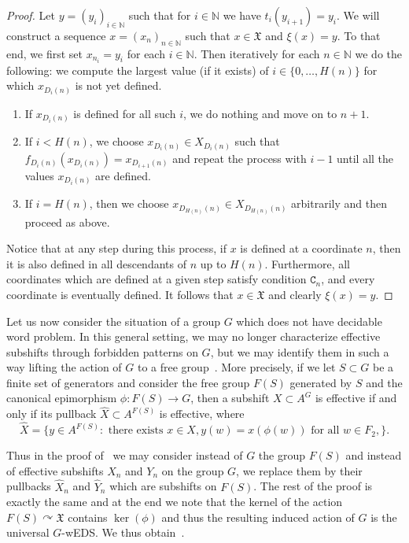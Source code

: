 \documentclass{article}
\theoremstyle{definition}
\theoremstyle{plain}
\newcommand{\NN}{\mathbb{N}}
\begin{document}
\begin{proof}
        Let $y = (y_i)_{i \in \NN}$ such that for $i \in \NN$ we have $t_i(y_{i+1})=y_{i}$. We will construct a sequence $x=(x_n)_{n \in \NN}$ such that $x \in \mathfrak{X}$ and $\xi(x)=y$. To that end, we first set $x_{n_i}=y_i$ for each $i \in \NN$. Then iteratively for each $n \in \NN$ we do the following: we compute the largest value (if it exists) of $i \in \{0,\dots,H(n)\}$ for which $x_{D_i(n)}$ is not yet defined.
        \begin{enumerate}
            \item If $x_{D_i(n)}$ is defined for all such $i$, we do nothing and move on to $n+1$.
            \item If $i < H(n)$, we choose $x_{D_i(n)} \in X_{D_i(n)}$ such that $f_{D_i(n)}(x_{D_i(n)}) = x_{D_{i+1}(n)}$ and repeat the process with $i-1$ until all the values $x_{D_i(n)}$ are defined.
            \item If $i = H(n)$, then we choose $x_{D_{H(n)}(n)} \in X_{D_{H(n)}(n)}$ arbitrarily and then proceed as above.
        \end{enumerate} 

        Notice that at any step during this process, if $x$ is defined at a coordinate $n$, then it is also defined in all descendants of $n$ up to $H(n)$. Furthermore, all coordinates which are defined at a given step satisfy condition $\mathtt{C}_n$, and every coordinate is eventually defined. It follows that $x\in \mathfrak{X}$ and clearly $\xi(x)=y$.\end{proof}

        Let us now consider the situation of a group $G$ which does not have decidable word problem.  In this general setting, we may no longer characterize effective subshifts through forbidden patterns on $G$, but we may identify them in such a way lifting the action of $G$ to a free group~\cite[Proposition 7.1]{BarCarRoj2025}. More precisely, if we let $S\subset G$ be a finite set of generators and consider the free group $F(S)$ generated by $S$ and the canonical epimorphism $\phi \colon F(S) \to G$, then a subshift $X\subset A^G$ is effective if and only if its pullback $\widehat{X}\subset A^{F(S)}$ is effective, where \[ \widehat{X} = \{ y \in A^{F(S)} : \mbox{ there exists } x \in X, y(w) = x(\phi(w)) \mbox{ for all } w \in F_2, \}.     \]
        
        Thus in the proof of~ we may consider instead of $G$ the group $F(S)$ and instead of effective subshifts $X_n$ and $Y_n$ on the group $G$, we replace them by their pullbacks $\widehat{X}_n$ and $\widehat{Y}_n$ which are subshifts on $F(S)$. The rest of the proof is exactly the same and at the end we note that the kernel of the action $F(S) \curvearrowright \mathfrak{X}$ contains $\operatorname{ker}(\phi)$ and thus the resulting induced action of $G$ is the universal $G$-wEDS. We thus obtain~.
\end{document}
